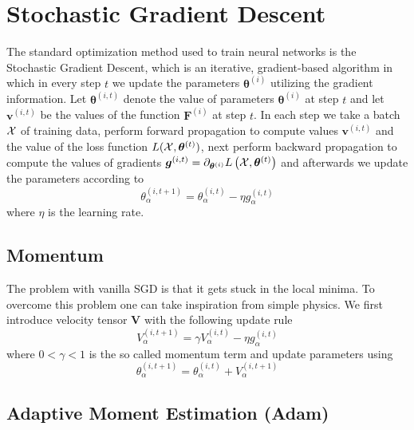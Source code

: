\documentclass{myclass}
\begin{document}
\section{Stochastic Gradient Descent}

The standard optimization method used to train neural networks is the Stochastic Gradient Descent, which is an iterative, gradient-based algorithm in which in every step \(t\) we update the parameters \(\bm{\theta}^{(i)}\) utilizing the gradient information. Let \(\bm{\theta}^{(i,t)}\) denote the value of parameters \(\bm{\theta}^{(i)}\) at step \(t\) and let \(\bm{v}^{(i,t)}\) be the values of the function \(\bm{F}^{(i)}\) at step \(t\). In each step we take a batch \(\mathcal{X}\)  of training data, perform forward propagation to compute values \(\bm{v}^{(i,t)}\) and the value of the loss function \(L(\mathcal{X},\bm{\theta}^{(t)})\), next perform backward propagation to compute the values of gradients \(\bm{g}^{(i,t)} = \partial_{\bm{\theta}^{(i)}}L\left(\mathcal{X},\bm{\theta}^{(t)}\right)\) and afterwards we update the parameters according to
\[\boxed{
   \theta_\alpha^{(i,t+1)} = \theta_\alpha^{(i,t)} - \eta g_\alpha^{(i,t)}
}\]
where \(\eta\) is the learning rate.

\subsection{Momentum}

The problem with vanilla SGD is that it gets stuck in the local minima. To overcome this problem one can take inspiration from simple physics. We first introduce velocity tensor \(\bm{V}\) with the following update rule
\[\boxed{
   V^{(i,t+1)}_\alpha = \gamma V^{(i,t)}_\alpha - \eta g^{(i,t)}_\alpha
}\]
where \(0 < \gamma < 1\) is the so called momentum term and update parameters using
\[\boxed{
   \theta_\alpha ^{(i,t+1)} = \theta_\alpha ^{(i,t)} + V_\alpha ^{(i,t+1)}
}\]

\subsection{Adaptive Moment Estimation (Adam)}
\end{document}

